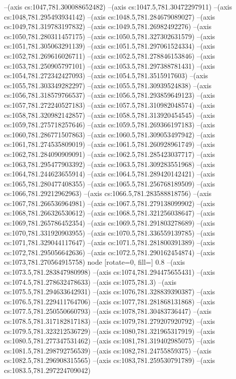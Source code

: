 --(axis cs:1047,781.300088652482)
--(axis cs:1047.5,781.30472297911)
--(axis cs:1048,781.295493934142)
--(axis cs:1048.5,781.284679089027)
--(axis cs:1049,781.319783197832)
--(axis cs:1049.5,781.26982492276)
--(axis cs:1050,781.280311457175)
--(axis cs:1050.5,781.327302631579)
--(axis cs:1051,781.305063291139)
--(axis cs:1051.5,781.297061524334)
--(axis cs:1052,781.269616026711)
--(axis cs:1052.5,781.278846153846)
--(axis cs:1053,781.250905797101)
--(axis cs:1053.5,781.297388781431)
--(axis cs:1054,781.272342427093)
--(axis cs:1054.5,781.3515917603)
--(axis cs:1055,781.303349282297)
--(axis cs:1055.5,781.30939524838)
--(axis cs:1056,781.318579766537)
--(axis cs:1056.5,781.293859649123)
--(axis cs:1057,781.272240527183)
--(axis cs:1057.5,781.310982048574)
--(axis cs:1058,781.320982142857)
--(axis cs:1058.5,781.313920454545)
--(axis cs:1059,781.275718257646)
--(axis cs:1059.5,781.269366197183)
--(axis cs:1060,781.286771507863)
--(axis cs:1060.5,781.309053497942)
--(axis cs:1061,781.274535809019)
--(axis cs:1061.5,781.260928961749)
--(axis cs:1062,781.284090909091)
--(axis cs:1062.5,781.285423037717)
--(axis cs:1063,781.295477903392)
--(axis cs:1063.5,781.309283551968)
--(axis cs:1064,781.244623655914)
--(axis cs:1064.5,781.289420142421)
--(axis cs:1065,781.280477408355)
--(axis cs:1065.5,781.256768189509)
--(axis cs:1066,781.29212962963)
--(axis cs:1066.5,781.283588818756)
--(axis cs:1067,781.266536964981)
--(axis cs:1067.5,781.279138099902)
--(axis cs:1068,781.266326530612)
--(axis cs:1068.5,781.321256038647)
--(axis cs:1069,781.265786452354)
--(axis cs:1069.5,781.291803278689)
--(axis cs:1070,781.331920903955)
--(axis cs:1070.5,781.336559139785)
--(axis cs:1071,781.329044117647)
--(axis cs:1071.5,781.281800391389)
--(axis cs:1072,781.295056642636)
--(axis cs:1072.5,781.290162454874)
--(axis cs:1073,781.270564915758) node [rotate=0, fill=\bgcol] {0.8}
--(axis cs:1073.5,781.283847980998)
--(axis cs:1074,781.294475655431)
--(axis cs:1074.5,781.278632478633)
--(axis cs:1075,781.3)
--(axis cs:1075.5,781.294633642931)
--(axis cs:1076,781.328839390387)
--(axis cs:1076.5,781.229411764706)
--(axis cs:1077,781.281868131868)
--(axis cs:1077.5,781.250550660793)
--(axis cs:1078,781.30483736447)
--(axis cs:1078.5,781.317182817183)
--(axis cs:1079,781.279207920792)
--(axis cs:1079.5,781.323212536729)
--(axis cs:1080,781.321965317919)
--(axis cs:1080.5,781.277347531462)
--(axis cs:1081,781.319402985075)
--(axis cs:1081.5,781.298792756539)
--(axis cs:1082,781.24755859375)
--(axis cs:1082.5,781.296908315565)
--(axis cs:1083,781.259530791789)
--(axis cs:1083.5,781.297224709042)
